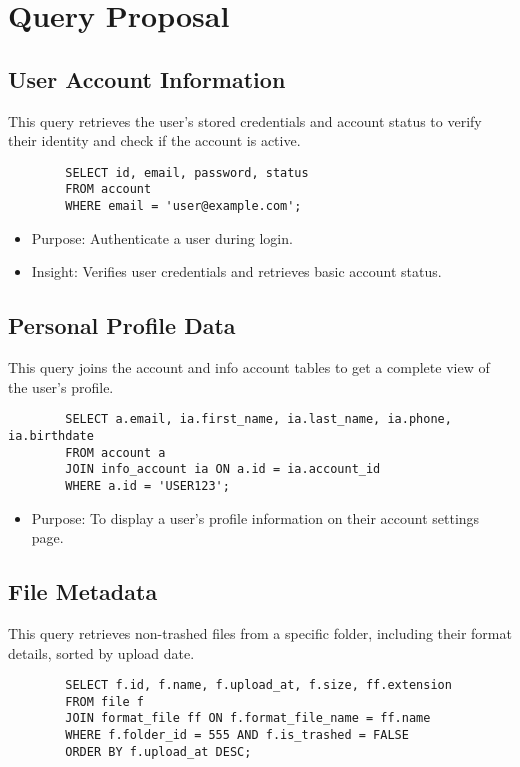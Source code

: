 \section{Query Proposal}
\subsection{User Account Information}
    This query retrieves the user's stored credentials and account status to verify their identity and check if the account is active.

    \begin{verbatim}
        SELECT id, email, password, status
        FROM account
        WHERE email = 'user@example.com';
    \end{verbatim}

    \begin{itemize}
        \item Purpose: Authenticate a user during login.
        \item Insight: Verifies user credentials and retrieves basic account status.
    \end{itemize}

\subsection{Personal Profile Data}
    This query joins the account and info account tables to get a complete view of the user's profile.
    \begin{verbatim}
        SELECT a.email, ia.first_name, ia.last_name, ia.phone, ia.birthdate
        FROM account a
        JOIN info_account ia ON a.id = ia.account_id
        WHERE a.id = 'USER123';
    \end{verbatim}

    \begin{itemize}
        \item Purpose: To display a user's profile information on their account settings page.
    \end{itemize}

\subsection{File Metadata}
    This query retrieves non-trashed files from a specific folder, including their format details, sorted by upload date.
    \begin{verbatim}
        SELECT f.id, f.name, f.upload_at, f.size, ff.extension
        FROM file f
        JOIN format_file ff ON f.format_file_name = ff.name
        WHERE f.folder_id = 555 AND f.is_trashed = FALSE
        ORDER BY f.upload_at DESC;
    \end{verbatim}

